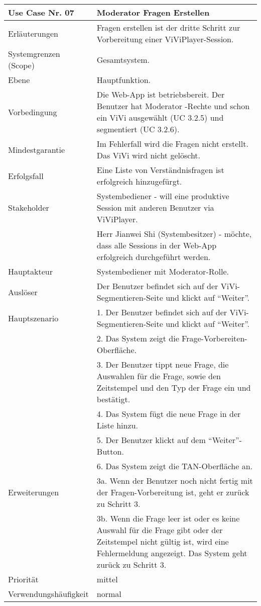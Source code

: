 \begin{tabularx}{\linewidth}{|l|X|}
	\hline
	Use Case Nr. 07			& \textbf{Moderator Fragen Erstellen} \\ \hline
	Erläuterungen			& Fragen erstellen ist der dritte Schritt zur Vorbereitung einer 
							  ViViPlayer-Session. \\ \hline
	Systemgrenzen (Scope)	& Gesamtsystem. \\ \hline
	Ebene					& Hauptfunktion. \\ \hline
	Vorbedingung			& Die Web-App ist betriebsbereit. Der Benutzer hat Moderator
							  -Rechte und schon ein ViVi ausgewählt (UC 3.2.5) und segmentiert (UC 3.2.6). \\ \hline
	Mindestgarantie			& Im Fehlerfall wird die Fragen nicht erstellt. 
							  Das ViVi wird nicht gelöscht. \\ \hline
	Erfolgsfall    			& Eine Liste von Verständnisfragen ist erfolgreich hinzugefürgt.
							  \\ \hline
	Stakeholder				& Systembediener - will eine produktive Session mit anderen 
	                          Benutzer via ViViPlayer. \\
							& Herr Jianwei Shi (Systembesitzer) - möchte, dass alle Sessions 
							  in der Web-App erfolgreich durchgeführt werden. \\ \hline
	Hauptakteur				& Systembediener mit Moderator-Rolle. \\ \hline
	Auslöser				& Der Benutzer befindet sich auf der ViVi-Segmentieren-Seite und 
							  klickt auf ``Weiter''. \\ \hline	
	Hauptszenario			& 1. Der Benutzer befindet sich auf der ViVi-Segmentieren-Seite 
	                          und klickt auf ``Weiter''. \\  
							& 2. Das System zeigt die Frage-Vorbereiten-Oberfläche. \\
							& 3. Der Benutzer tippt neue Frage, die Auswahlen für die 
							  Frage, sowie den Zeitstempel und den Typ der Frage ein und 
							  bestätigt. \\ 
							& 4. Das System fügt die neue Frage in der Liste hinzu. \\ 
							& 5. Der Benutzer klickt auf dem ``Weiter''-Button. \\ 
							& 6. Das System zeigt die TAN-Oberfläche an. \\ \hline
	Erweiterungen			& 3a. Wenn der Benutzer noch nicht fertig mit der 
							  Fragen-Vorbereitung ist, geht er zurück zu Schritt 3. \\
							& 3b. Wenn die Frage leer ist oder es keine Auswahl für die 
							  Frage gibt oder der Zeitstempel nicht gültig ist, wird eine 
							  Fehlermeldung angezeigt. Das System geht zurück zu Schritt 3.
							  \\ \hline
	Priorität				& mittel \\ \hline
	Verwendungshäufigkeit	& normal \\ \hline
\end{tabularx}
